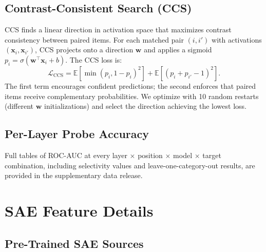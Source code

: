 \subsection{Contrast-Consistent Search (CCS)}

CCS \citep{burns2022discovering} finds a linear direction in activation
space that maximizes contrast consistency between paired items.  For each
matched pair $(i, i')$ with activations $(\mathbf{x}_i, \mathbf{x}_{i'})$,
CCS projects onto a direction $\mathbf{w}$ and applies a sigmoid
$p_i = \sigma(\mathbf{w}^\top \mathbf{x}_i + b)$.  The CCS loss is:
\begin{equation}
  \mathcal{L}_{\text{CCS}} = \mathbb{E}\!\left[\min(p_i, 1 - p_i)^2\right]
  + \mathbb{E}\!\left[(p_i + p_{i'} - 1)^2\right].
\end{equation}
The first term encourages confident predictions; the second enforces that
paired items receive complementary probabilities.  We optimize with 10
random restarts (different $\mathbf{w}$ initializations) and select the
direction achieving the lowest loss.

\subsection{Per-Layer Probe Accuracy}

Full tables of ROC-AUC at every layer $\times$ position $\times$ model
$\times$ target combination, including selectivity values and
leave-one-category-out results, are provided in the supplementary data
release.

\section{SAE Feature Details}
\label{app:sae}

\subsection{Pre-Trained SAE Sources}

